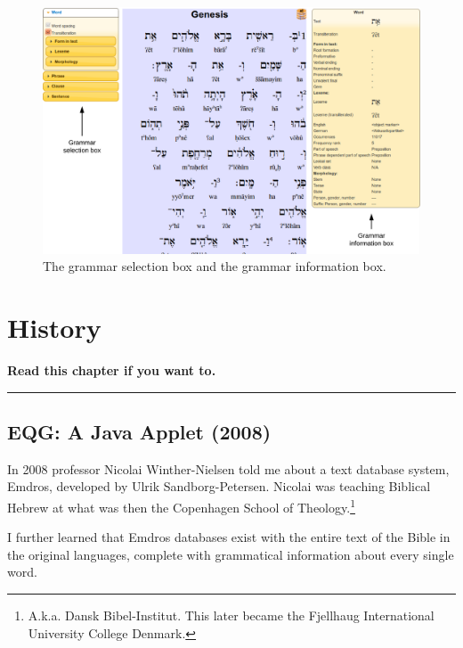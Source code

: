 \documentclass[11pt,oneside,a4paper]{memoir}
\begin{document}
\begin{figure}[h]
\includegraphics[width=\textwidth]{grammarboxes.png}
\caption{The grammar selection box and
  the grammar information box.}\label{fig-grammar-info}
\end{figure}


\chapter{History}

\textbf{Read this chapter if you want to.}
\plainbreak{3}


\section{EQG: A Java Applet (2008)}

In 2008 professor Nicolai Winther-Nielsen told me about a text
database system, Emdros, developed by Ulrik Sandborg-Petersen.
Nicolai was teaching Biblical Hebrew at what was then the Copenhagen School of
Theology.\footnote{A.k.a. Dansk Bibel-Institut. This later became the Fjellhaug International
  University College Denmark.}

I further learned that Emdros databases exist with the entire text of the Bible in the original
languages, complete with grammatical information about every single word.
\end{document}

